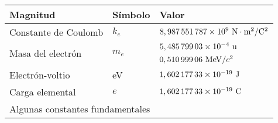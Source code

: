 \documentclass[11pt]{articulo}
\begin{document}
\begingroup
\renewcommand{\arraystretch}{1.5} %
\begin{tabular}{lll}
Magnitud & S\'imbolo & Valor\\
\hline
Constante de Coulomb & $k_e$ & ${\rm 8,987\,551\,787 \times 10^9~N \cdot m^2 / C^2}$\\
\multirow{2}{*}{Masa del electr\'on} & \multirow{2}{*}{$m_e$} & ${\rm 5,485\,799\,03 \times 10^{-4}~u}$\\
                                     &                        & ${\rm 0,510\,999\,06~MeV/}c^2$\\
Electr\'on-voltio    & eV    & ${\rm 1,602\,177\,33 \times 10^{-19}~J}$\\
Carga elemental      & $e$   & ${\rm 1,602\,177\,33 \times 10^{-19}~C}$\\
\hline
\multicolumn{3}{l}{Algunas constantes fundamentales}\\
\end{tabular}
\endgroup
\end{document}
